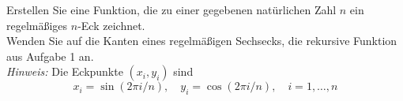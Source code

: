 \begin{aufg}[0]
 Erstellen Sie eine Funktion, die zu einer gegebenen natürlichen
  Zahl $n$ ein regelmäßiges $n$-Eck zeichnet.\\

Wenden Sie auf die Kanten eines regelm\"a{\ss}igen Sechsecks, die rekursive
Funktion aus Aufgabe 1 an.\\ 

{\it Hinweis:} Die Eckpunkte $(x_i,y_i)$ sind {
\[ x_i=\sin( 2 {\pi i}/{n} ), \quad  y_i=\cos( 2 {\pi i}/{n} ),
  \quad i=1, \dots ,n \]  }

\end{aufg}